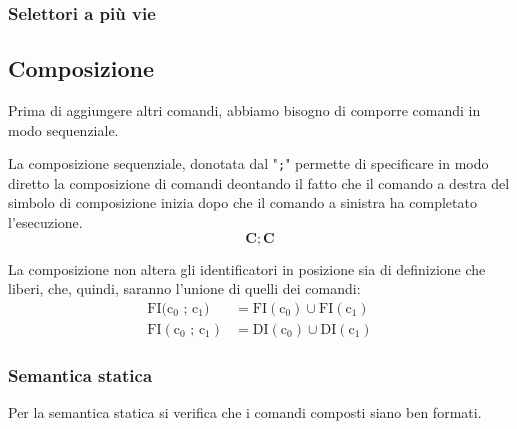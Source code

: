 



\subsubsection{Selettori a più vie}

\subsection{Composizione}
Prima di aggiungere altri comandi, abbiamo bisogno di comporre comandi in modo sequenziale.

\smallskip
La composizione sequenziale, donotata dal "\texttt{;}" permette di specificare in modo diretto la composizione di comandi deontando il fatto che il comando a destra del simbolo di composizione inizia dopo che il comando a sinistra ha completato l'esecuzione.
\[
        \mathbf{C ; C}
\]

La composizione non altera gli identificatori in posizione sia di definizione che liberi, che, quindi, saranno l'unione di quelli dei comandi:
\[
    \begin{aligned}
        \mathrm{FI}(\texttt{$\mathrm{c_0}$ ; $\mathrm{c_1})$} &= \mathrm{FI(c_0)} \cup \mathrm{FI(c_1)}\\
        \mathrm{FI(\texttt{$\mathrm{c_0}$ ; $\mathrm{c_1}$})} &= \mathrm{DI(c_0)} \cup \mathrm{DI(c_1)}
    \end{aligned}
\]

\subsubsection{Semantica statica}
Per la semantica statica si verifica che i comandi composti siano ben formati.


